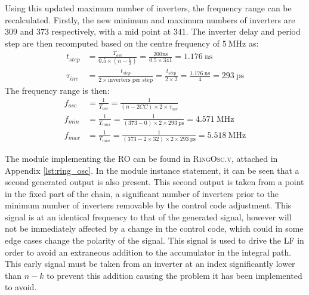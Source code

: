 Using this updated maximum number of inverters, the frequency range can be recalculated. Firstly, the new minimum and maximum numbers of inverters are $309$ and $373$ respectively, with a mid point at $341$. The inverter delay and period step are then recomputed based on the centre frequency of $5~\si{\mega\hertz}$ as:
\begin{align}
t_{step} &= \frac{T_{osc}}{0.5\times(n-\frac{k}{2})} = \frac{200\si{\nano\second}}{0.5\times 341} = 1.176~\si{\nano\second} \\
\tau_{inv} &= \frac{t_{step}}{2\times\text{inverters per step}} = \frac{t_{step}}{2\times2} = \frac{1.176~\si{\nano\second}}{4} = 293~\si{\pico\second}
\end{align}
The frequency range is then:
\begin{align} 
f_{osc} &= \frac{1}{T_{osc}} = \frac{1}{(n-2CC)\times 2\times\tau_{inv}} \\
f_{min} &= \frac{1}{T_{max}} = \frac{1}{(373-0)\times 2\times 293~\si{\pico\second}} = 4.571~\si{\mega\hertz} \\
f_{max} &= \frac{1}{T_{min}} = \frac{1}{(373-2\times32)\times 2\times 293~\si{\pico\second}} = 5.518~\si{\mega\hertz}
\end{align}

The module implementing the \ac{RO} can be found in \textsc{RingOsc.v}, attached in Appendix \ref{lst:ring_osc}. In the module instance statement, it can be seen that a second generated output is also present. This second output is taken from a point in the fixed part of the chain, a significant number of inverters prior to the minimum number of inverters removable by the control code adjustment. This signal is at an identical frequency to that of the generated signal, however will not be immediately affected by a change in the control code, which could in some edge cases change the polarity of the signal. This signal is used to drive the \ac{LF} in order to avoid an extraneous addition to the accumulator in the integral path. This early signal must be taken from an inverter at an index significantly lower than $n-k$ to prevent this addition causing the problem it has been implemented to avoid.

